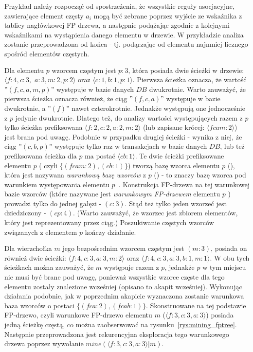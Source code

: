 Przykład należy rozpocząć od spostrzeżenia, że wszystkie reguły asocjacyjne, zawierające element częsty $a_i$ mogą być zebrane poprzez wyjście ze wskaźnika z tablicy nagłówkowej FP-drzewa, a następnie podążając zgodnie z kolejnymi wskaźnikami na wystąpienia danego elementu w drzewie. W przykładzie analiza zostanie przeprowadzona od końca - tj. podąrzając od elementu najmniej licznego spośród elementów częstych.

Dla elementu $p$ wzorcem częstym jest $p: 3$, która posiada dwie ścieżki w drzewie: $\langle f: 4, c: 3,$ $a: 3, m: 2, p: 2\rangle$ oraz $\langle c: 1, b: 1, p: 1\rangle$. Pierwsza ścieżka oznacza, że wartość ''$( f, c, a, m, p )$'' występuje w bazie danych $DB$ dwukrotnie. Warto zauważyć, że pierwsza ścieżka oznacza również, że ciąg ''$( f, c, a )$'' występuje w bazie dwukrotnie, a ''$(f)$'' nawet czterokrotnie. Jednakże występują one jednocześnie z $p$ jedynie dwukrotnie. Dlatego też, do analizy wartości występujących razem z $p$ tylko ścieżka prefiksowana $\langle f: 2, c: 2, a: 2, m: 2\rangle$ (lub zapisane krócej: $\langle fcam: 2\rangle$) jest brana pod uwagę. Podobnie w przypadku drugiej ścieżki - wynika z niej, że ciąg ''$(c, b, p)$'' występuje tylko raz w transakcjach w bazie danych $DB$, lub też prefiksowana ścieżka dla $p$ ma postać $\langle cb: 1 \rangle$. Te dwie ścieżki prefiksowane elementu $p$ ( czyli $\lbrace ( fcam: 2 ), (cb: 1) \rbrace$) tworzą bazę wzorca elementu $p$ (), która jest nazywana \emph{warunkową bazę wzorców} z $p$ () - to znaczy bazę wzorca pod warunkiem występowania elementu $p$~\cite{Main:FPgrowth}. Konstrukcja FP-drzewa na tej warunkowej bazie wzorców (które nazywane jest \emph{warunkowym FP-drzewem} elementu $p$ ) prowadzi tylko do jednej gałęzi - $(c:3)$. Stąd też tylko jeden wzorzeć jest dziedziczony - $(cp:4)$. (Warto zauważyć, że wzorzec jest zbiorem elementów, który jest reprezentowany przez ciąg.) Poszukiwanie częstych wzorców związanych z elementem $p$ kończy działanie.

Dla wierzchołka $m$ jego bezpośrednim wzorcem częstym jest $(m:3)$, posiada on również dwie ścieżki: $\langle f: 4, c: 3, a: 3, m: 2 \rangle$ oraz $\langle f: 4, c: 3, a: 3, b: 1, m: 1 \rangle$. W obu tych ścieżkach można zauważyć, że $m$ występuje razem z $p$, jednakże $p$ w tym miejscu nie musi być brane pod uwagę, ponieważ wszystkie wzorce częste dla tego elementu zostały znalezione wcześniej (opisano to akapit wcześniej). Wykonując działania podobnie, jak w poprzednim akapicie wyznaczona zostanie warunkowa baza wzorców o postaci $\lbrace (fca: 2), (fcab: 1) \rbrace$. Skonstruowane na tej podstawie FP-drzewo, czyli warunkowe FP-drzewo elementu $m$ ($\langle f: 3, c: 3, a: 3 \rangle$) posiada jedną ścieżkę częstą, co można zaobserwować na rysunku~\ref{rys:mining_fptree}. Następnie przeprowadzona jest rekurencyjna eksploracja tego warunkowego drzewa poprzez wywołanie $mine(\langle f: 3, c: 3, a: 3 \rangle | m)$.

